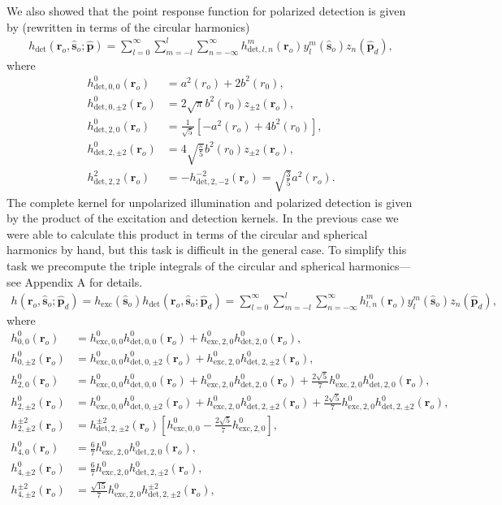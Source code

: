 \documentclass[11pt]{article}
\providecommand{\ro}[1]{\mathbf{\mathbf{r}}_o}
\providecommand{\so}[1]{\mathbf{\hat{s}}_o}
\providecommand{\mh}[1]{\mathbf{\hat{#1}}}
\begin{document}
We also showed that the point response function for polarized detection is given
by (rewritten in terms of the circular harmonics)
\begin{align}
  h_{\text{det}}(\ro{}, \so{}; \mh{p}) = \sum_{l=0}^{\infty}\sum_{m=-l}^l\sum_{n=-\infty}^{\infty} h_{\text{det},l,n}^m(\ro{})y_l^m(\so{})z_n(\mh{p}_d), 
\end{align}
where
\begin{align}
  h_{\text{det},0,0}^0(\ro{}) &= a^2(r_o) + 2b^2(r_0),\\
  h_{\text{det},0,\pm 2}^0(\ro{}) &= 2\sqrt{\pi} b^2(r_0)z_{\pm 2}(\ro{}),\\
  h_{\text{det},2,0}^0(\ro{}) &= \frac{1}{\sqrt{5}}\left[-a^2(r_o) + 4b^2(r_0)\right],\\
  h_{\text{det},2,\pm 2}^0(\ro{}) &= 4\sqrt{\frac{\pi}{5}}b^2(r_0)z_{\pm 2}(\ro{}),\\
  h_{\text{det},2,2}^2(\ro{}) &= -h_{\text{det},2,-2}^{-2}(\ro{}) = \sqrt{\frac{3}{5}}a^2(r_o).
\end{align}
The complete kernel for unpolarized illumination and polarized detection is
given by the product of the excitation and detection kernels. In the previous
case we were able to calculate this product in terms of the circular and
spherical harmonics by hand, but this task is difficult in the general case. To
simplify this task we precompute the triple integrals of the circular and spherical
harmonics---see Appendix A for details. 
\begin{align}
  h(\ro{}, \so{}; \mh{p}_d) = h_{\text{exc}}(\so{})h_{\text{det}}(\ro{}, \so{}; \mh{p}_d) = \sum_{l=0}^{\infty}\sum_{m=-l}^l\sum_{n=-\infty}^{\infty} h_{l,n}^m(\ro{})y_l^m(\so{})z_n(\mh{p}_d), 
\end{align}
where
\begin{align}
  h_{0,0}^0(\ro{}) &= h_{\text{exc},0,0}^0 h_{\text{det},0,0}^0(\ro{}) + h_{\text{exc},2,0}^0 h_{\text{det},2,0}^0(\ro{}),\\
  h_{0,\pm 2}^0(\ro{}) &= h_{\text{exc},0,0}^0 h_{\text{det},0,\pm 2}^0(\ro{}) + h_{\text{exc},2,0}^0 h_{\text{det},2,\pm 2}^0(\ro{}),\\
  h_{2,0}^0(\ro{}) &= h_{\text{exc},0,0}^0 h_{\text{det},0,0}^0(\ro{}) + h_{\text{exc},2,0}^0 h_{\text{det},2,0}^0(\ro{}) + \frac{2\sqrt{5}}{7}h_{\text{exc},2,0}^0h_{\text{det},2,0}^0(\ro{}),\\
  h_{2,\pm 2}^0(\ro{}) &= h_{\text{exc},0,0}^0 h_{\text{det},0,\pm 2}^0(\ro{}) + h_{\text{exc},2,0}^0 h_{\text{det},2,\pm 2}^0(\ro{}) + \frac{2\sqrt{5}}{7}h_{\text{exc},2,0}^0h_{\text{det},2,\pm 2}^0(\ro{}),\\
  h_{2,\pm 2}^{\pm 2}(\ro{}) &= h_{\text{det},2,\pm 2}^{\pm 2}(\ro{})\left[h_{\text{exc},0,0}^0 - \frac{2\sqrt{5}}{7}h_{\text{exc},2,0}^0\right],\\
  h_{4,0}^0(\ro{}) &= \frac{6}{7}h_{\text{exc},2,0}^0h_{\text{det},2,0}^0(\ro{}),\\
  h_{4,\pm 2}^0(\ro{}) &= \frac{6}{7}h_{\text{exc},2,0}^0h_{\text{det},2,\pm 2}^0(\ro{}),\\
  h_{4,\pm 2}^{\pm 2}(\ro{}) &= \frac{\sqrt{15}}{7}h_{\text{exc},2,0}^0h_{\text{det},2,\pm 2}^{\pm 2}(\ro{}),
\end{align}
\end{document}
